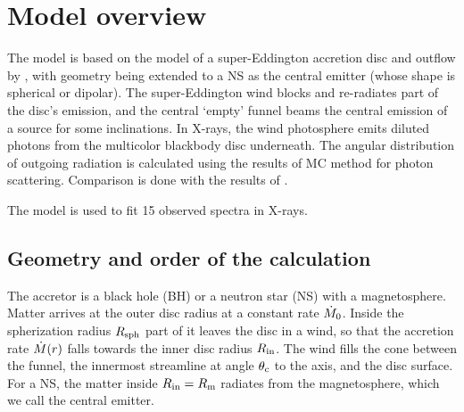 
\section{Model overview}
\label{sec:model}

The model is based on the model of a super-Eddington accretion disc and outflow by \citet{Poutanen2007}, with geometry being extended to a NS as the central emitter (whose shape is spherical or dipolar). The super-Eddington wind blocks and re-radiates part of the disc's emission, and the central `empty' funnel beams the central emission of a source for some inclinations. In X-rays, the wind photosphere emits diluted photons from the multicolor blackbody disc underneath. The angular distribution of outgoing radiation is calculated using the results of MC method for photon scattering. Comparison is done with the results of  \cite{Ahlberg2026}. 

The model is used to fit 15 observed spectra in X-rays. 
\subsection{Geometry and order of the calculation}
\label{sec:model:geometry}

The accretor is a black hole (BH) or a neutron star (NS) with a magnetosphere.
Matter arrives at the outer disc radius at a constant rate $\dot M_0$.
Inside the spherization radius $R_{\rm sph}$ part of it leaves the disc in a wind, so that the accretion rate $\dot M(r)$ falls towards the inner disc radius $R_{\rm in}$.
The wind fills the cone between the funnel, the innermost streamline at angle $\theta_{\rm c}$ to the axis, and the disc surface.
For a NS, the matter inside $R_{\rm in} = R_{\rm m}$ radiates from the magnetosphere, which we call the central emitter.

